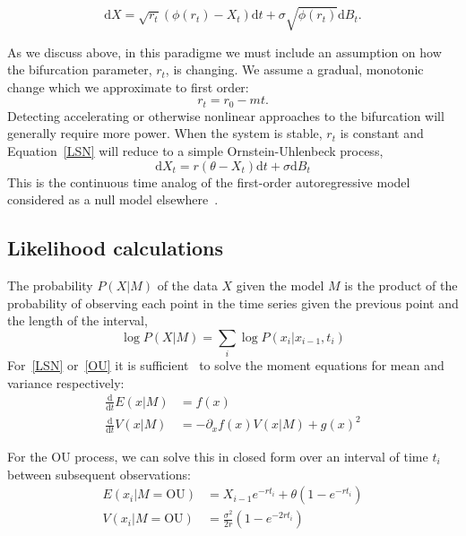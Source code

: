 \documentclass[authoryear,review,11pt]{elsarticle}
\newcommand{\ud}{\mathrm{d}}
\begin{document}
\begin{equation}
\ud X = \sqrt{ r_t } (\phi(r_t) - X_t)\ud t + \sigma\sqrt{\phi(r_t) } \ud B_t. \label{LSN}
\end{equation}



As we discuss above, in this paradigme we must include an assumption on how the bifurcation parameter, $r_t$, is changing.
We assume a gradual, monotonic change which we approximate to first order: 
\begin{equation}
r_t = r_0 - m t.
\label{R_t}
\end{equation}
Detecting accelerating or otherwise nonlinear approaches to the bifurcation will generally require more power.
When the system is stable, $r_t$ is constant and Equation~\eqref{LSN} will reduce to a simple Ornstein-Uhlenbeck process, 
\begin{equation}
\ud X_t = r (\theta - X_t) \ud t + \sigma \ud B_t \label{OU}
\end{equation}
This is the continuous time analog of the first-order autoregressive model considered as a null model elsewhere~\citep[\emph{e.g.}][]{Dakos2008, Guttal2008a}. 




\subsection*{Likelihood calculations}
The probability $P(X|M)$ of the data $X$ given the model $M$ is the product of the probability of observing each point in the time series given the previous point and the length of the interval,  
\begin{equation}
\log P(X | M)=  \sum_i \log P(x_i | x_{i-1}, t_i)
\end{equation}
For~\eqref{LSN} or~\eqref{OU} it is sufficient~\citep{Gardiner2009} to solve the moment equations for mean and variance respectively:
\begin{align}
 \frac{\ud }{\ud t} E(x| M)&=  f(x) \\
\frac{\ud}{\ud t} V(x| M) &=  -\partial_x f(x) V(x|M) + g(x)^2 
  \label{general_moments}
\end{align}

For the OU process, we can solve this in closed form over an interval of time $t_i$ between subsequent observations: 
\begin{align}
  E(x_i| M = \text{OU}) &= X_{i-1} e^{-r t_i} + \theta \left(1 - e^{-rt_i} \right) \\
V(x_i| M = \text{OU}) &= \frac{\sigma^2}{2 r} \left(1 - e^{-2 r t_i} \right)
\label{OUsoln}
\end{align}
\end{document}
